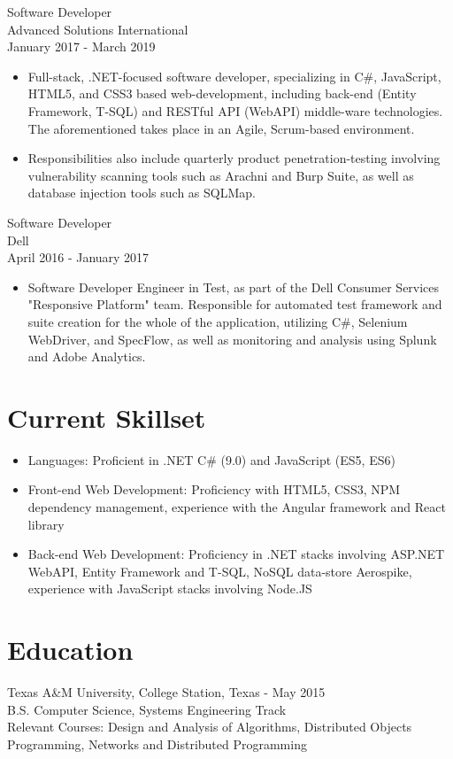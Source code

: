 \documentclass[11pt]{res} %
\begin{document}
\begin{resume}
Software Developer \\
Advanced Solutions International \\
January 2017 - March 2019
\vspace{0.2in}
   \begin{itemize} \itemsep -2pt  %
   \item Full-stack, .NET-focused software developer, specializing in C\#, JavaScript, HTML5, and CSS3 based web-development, including back-end (Entity Framework, T-SQL) and RESTful API (WebAPI) middle-ware technologies. The aforementioned takes place in an Agile, Scrum-based environment.
\newline
    \item Responsibilities also include quarterly product penetration-testing involving vulnerability scanning tools such as Arachni and Burp Suite, as well as database injection tools such as SQLMap.
 \end{itemize}

 Software Developer \\
Dell \\
April 2016 - January 2017
\vspace{0.2in}
   \begin{itemize} \itemsep -2pt  %
   \item Software Developer Engineer in Test, as part of the Dell Consumer Services "Responsive Platform" team. Responsible for automated test framework and suite creation for the whole of the application, utilizing C\#, Selenium WebDriver, and SpecFlow, as well as monitoring and analysis using Splunk and Adobe Analytics.
 \end{itemize}

\section{Current Skillset} 
 
   \begin{itemize} \itemsep -2pt  %
   \item Languages: Proficient in .NET C\# (9.0) and JavaScript (ES5, ES6)
\\
   \item Front-end Web Development: Proficiency with HTML5, CSS3, NPM dependency management, experience with the Angular framework and React library
\\
    \item Back-end Web Development: Proficiency in .NET stacks involving ASP.NET WebAPI, Entity Framework and T-SQL, NoSQL data-store Aerospike, experience with JavaScript stacks involving Node.JS
 \end{itemize}
 
\section{Education} 
 \noindent Texas A\&M University, College Station, Texas - May 2015 \\
B.S. Computer Science, Systems Engineering Track \\
Relevant Courses: Design and Analysis of Algorithms, Distributed Objects Programming, Networks and Distributed Programming

\end{resume}
\end{document}
